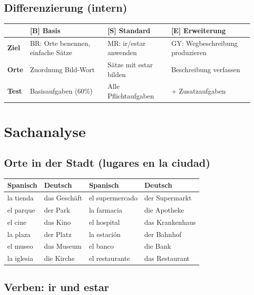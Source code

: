 \documentclass[11pt,a4paper]{article}
\newcommand{\B}{\textcolor{basis}{\textbf{[B]}}}
\newcommand{\Std}{\textcolor{standard}{\textbf{[S]}}}
\newcommand{\E}{\textcolor{erweiterung}{\textbf{[E]}}}
\begin{document}
\subsection{Differenzierung (intern)}
\begin{tabular}{|l|p{3.5cm}|p{3.5cm}|p{3.5cm}|}
\hline
& \B{} \textbf{Basis} & \Std{} \textbf{Standard} & \E{} \textbf{Erweiterung} \\
\hline
\textbf{Ziel} & BR: Orte benennen, einfache Sätze & MR: ir/estar anwenden & GY: Wegbeschreibung produzieren \\
\hline
\textbf{Orte} & Zuordnung Bild-Wort & Sätze mit estar bilden & Beschreibung verfassen \\
\hline
\textbf{Test} & Basisaufgaben (60\%) & Alle Pflichtaufgaben & + Zusatzaufgaben \\
\hline
\end{tabular}

\section{Sachanalyse}

\subsection{Orte in der Stadt (lugares en la ciudad)}
\begin{center}
\begin{tabular}{|l|l||l|l|}
\hline
\textbf{Spanisch} & \textbf{Deutsch} & \textbf{Spanisch} & \textbf{Deutsch} \\
\hline
la tienda & das Geschäft & el supermercado & der Supermarkt \\
\hline
el parque & der Park & la farmacia & die Apotheke \\
\hline
el cine & das Kino & el hospital & das Krankenhaus \\
\hline
la plaza & der Platz & la estación & der Bahnhof \\
\hline
el museo & das Museum & el banco & die Bank \\
\hline
la iglesia & die Kirche & el restaurante & das Restaurant \\
\hline
\end{tabular}
\end{center}

\subsection{Verben: ir und estar}
\end{document}
